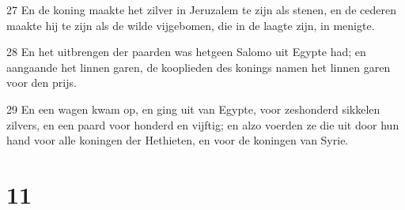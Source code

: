 \par 27 En de koning maakte het zilver in Jeruzalem te zijn als stenen, en de cederen maakte hij te zijn als de wilde vijgebomen, die in de laagte zijn, in menigte.
\par 28 En het uitbrengen der paarden was hetgeen Salomo uit Egypte had; en aangaande het linnen garen, de kooplieden des konings namen het linnen garen voor den prijs.
\par 29 En een wagen kwam op, en ging uit van Egypte, voor zeshonderd sikkelen zilvers, en een paard voor honderd en vijftig; en alzo voerden ze die uit door hun hand voor alle koningen der Hethieten, en voor de koningen van Syrie.

\chapter{11}


